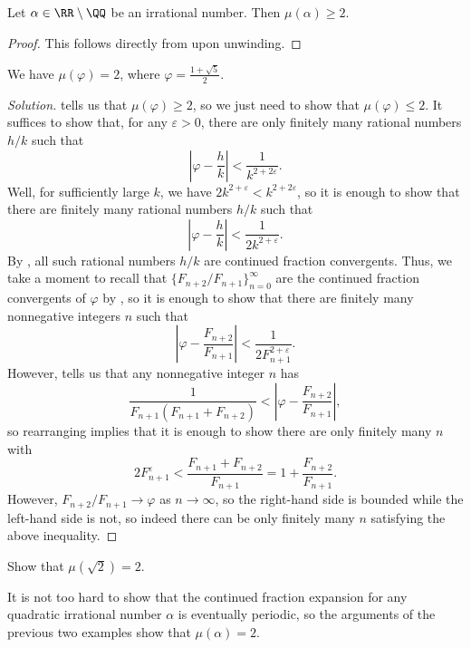 \documentclass[../notes.tex]{subfiles}
\begin{document}
\begin{lemma} \label{lem:irrat-measure-at-least-2}
	Let $\alpha\in\RR\setminus\QQ$ be an irrational number. Then $\mu(\alpha)\ge2$.
\end{lemma}
\begin{proof}
	This follows directly from  upon unwinding.
\end{proof}
\begin{example} \label{ex:mu-phi}
	We have $\mu\left(\varphi\right)=2$, where $\varphi=\frac{1+\sqrt5}2$.
\end{example}
\begin{proof}[Solution]
	 tells us that $\mu(\varphi)\ge2$, so we just need to show that $\mu(\varphi)\le 2$. It suffices to show that, for any $\varepsilon>0$, there are only finitely many rational numbers $h/k$ such that
	\[\left|\varphi-\frac hk\right|<\frac1{k^{2+2\varepsilon}}.\]
	Well, for sufficiently large $k$, we have $2k^{2+\varepsilon}<k^{2+2\varepsilon}$, so it is enough to show that there are finitely many rational numbers $h/k$ such that
	\[\left|\varphi-\frac hk\right|<\frac1{2k^{2+\varepsilon}}.\]
	By , all such rational numbers $h/k$ are continued fraction convergents. Thus, we take a moment to recall that $\{F_{n+2}/F_{n+1}\}_{n=0}^\infty$ are the continued fraction convergents of $\varphi$ by , so it is enough to show that there are finitely many nonnegative integers $n$ such that
	\[\left|\varphi-\frac{F_{n+2}}{F_{n+1}}\right|<\frac1{2F_{n+1}^{2+\varepsilon}}.\]
	However,  tells us that any nonnegative integer $n$ has
	\[\frac1{F_{n+1}(F_{n+1}+F_{n+2})}<\left|\varphi-\frac{F_{n+2}}{F_{n+1}}\right|,\]
	so rearranging implies that it is enough to show there are only finitely many $n$ with
	\[2F_{n+1}^{\varepsilon}<\frac{F_{n+1}+F_{n+2}}{F_{n+1}}=1+\frac{F_{n+2}}{F_{n+1}}.\]
	However, $F_{n+2}/F_{n+1}\to\varphi$ as $n\to\infty$, so the right-hand side is bounded while the left-hand side is not, so indeed there can be only finitely many $n$ satisfying the above inequality.
\end{proof}
\begin{exe} \label{exe:mu-root-2}
	Show that $\mu\left(\sqrt2\right)=2$.
\end{exe}
\begin{remark}
	It is not too hard to show that the continued fraction expansion for any quadratic irrational number $\alpha$ is eventually periodic, so the arguments of the previous two examples show that $\mu(\alpha)=2$.
\end{remark}
\end{document}
